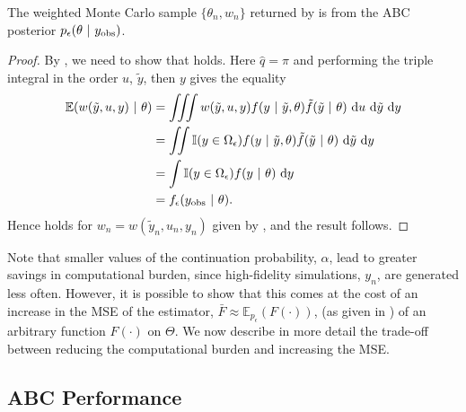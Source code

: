 \documentclass[review]{siamonline190516}
\begin{document}
\begin{proposition}
\label{MFABCValidity}
The weighted Monte Carlo sample $\{ \theta_n, w_n\}$ returned by  is from the ABC posterior $p_\epsilon(\theta~|~y_{\mathrm{obs}})$.
\end{proposition}
\begin{proof}
By , we need to show that  holds.
Here $\hat q = \pi$ and performing the triple integral in the order $u$, $\tilde y$, then $y$ gives the equality
\begin{align*}
\mathbb E(w(\tilde y, u, y)~|~\theta) 
&= \iiint w(\tilde y, u, y) f(y~|~\tilde y, \theta) \tilde f(\tilde y~|~\theta) ~\mathrm du ~\mathrm d\tilde y ~\mathrm dy 
\\
&= \iint \mathbb I(y \in \Omega_\epsilon) f(y~|~\tilde y, \theta) \tilde f(\tilde y~|~\theta) ~\mathrm d\tilde y ~\mathrm dy
\\
&= \int \mathbb I(y \in \Omega_\epsilon) f(y~|~\theta) ~\mathrm dy
\\
&= f_\epsilon(y_{\mathrm{obs}}~|~\theta).
\end{align*}
Hence  holds for $w_n = w(\tilde y_n, u_n, y_n)$ given by , and the result follows.
\end{proof}

Note that smaller values of the continuation probability, $\alpha$, lead to greater savings in computational burden, since high-fidelity simulations, $y_n$, are generated less often.
However, it is possible to show that this comes at the cost of an increase in the MSE of the estimator, $\bar F \approx \mathbb E_{p_\epsilon}(F(\cdot))$, (as given in ) of an arbitrary function $F(\cdot)$ on $\Theta$.
We now describe in more detail the trade-off between reducing the computational burden and increasing the MSE.

\subsection{ABC Performance}
\label{s:Performance}
\end{document}
